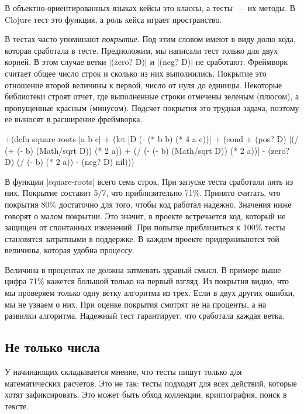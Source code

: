 В объектно-ориентированных языках кейсы это классы, а тесты~--- их методы. В
Clojure тест это функция, а роль кейса играет пространство.

В тестах часто упоминают \emph{покрытие}. Под этим словом имеют в виду долю
кода, которая сработала в тесте. Предположим, мы написали тест только для двух
корней. В этом случае ветки \spverb|(zero? D)| и \spverb|(neg? D)| не
сработают. Фреймворк считает общее число строк и сколько из них
выполнились. Покрытие это отношение второй величины к первой, число от нуля до
единицы. Некоторые библиотеки строят отчет, где выполненные строки отмечены
зеленым (плюсом), а пропущенные красным (минусом). Подсчет покрытия это трудная
задача, поэтому ее выносят в расширение фреймворка.

\begin{english}
  \begin{diff}
+(defn square-roots [a b c]
+  (let [D (- (* b b) (* 4 a c))]
+    (cond
+      (pos? D) [(/ (+ (- b) (Math/sqrt D)) (* 2 a))
+                (/ (- (- b) (Math/sqrt D)) (* 2 a))]
-      (zero? D) (/ (- b) (* 2 a))
-      (neg? D) nil)))
  \end{diff}
\end{english}

В функции \spverb|square-roots| всего семь строк. При запуске теста сработали
пять из них. Покрытие составит 5/7, что приблизительно 71\%. Принято считать,
что покрытия 80\% достаточно для того, чтобы код работал надежно. Значения ниже
говорят о малом покрытии. Это значит, в проекте встречается код, который не
защищен от спонтанных изменений. При попытке приблизиться к 100\% тесты
становятся затратными в поддержке. В каждом проекте придерживаются той величины,
которая удобна процессу.

Величина в процентах не должна затмевать здравый смысл. В примере выше цифра
71\% кажется большой только на первый взгляд. Из покрытия видно, что мы
проверяем только одну ветку алгоритма из трех. Если в двух других ошибки, мы не
узнаем о них. При оценке покрытия смотрят не на проценты, а на развилки
алгоритма. Надежный тест гарантирует, что сработала каждая ветка.

\subsection{Не только числа}

У начинающих складывается мнение, что тесты пишут только для математических
расчетов. Это не так: тесты подходят для всех действий, которые хотят
зафиксировать. Это может быть обход коллекции, криптография, поиск в тексте.

